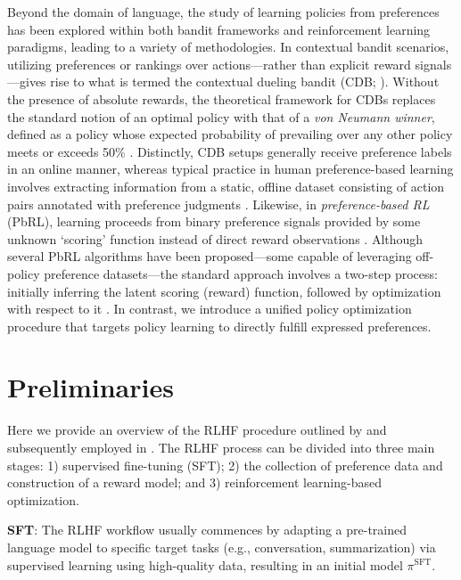 Beyond the domain of language, the study of learning policies from preferences has been explored within both bandit frameworks and reinforcement learning paradigms, leading to a variety of methodologies. In contextual bandit scenarios, utilizing preferences or rankings over actions—rather than explicit reward signals—gives rise to what is termed the contextual dueling bandit (CDB; \cite{yue2012karmed,dudik2015contextual}). Without the presence of absolute rewards, the theoretical framework for CDBs replaces the standard notion of an optimal policy with that of a \textit{von Neumann winner}, defined as a policy whose expected probability of prevailing over any other policy meets or exceeds 50\% \citep{dudik2015contextual}. Distinctly, CDB setups generally receive preference labels in an online manner, whereas typical practice in human preference-based learning involves extracting information from a static, offline dataset consisting of action pairs annotated with preference judgments \citep{yan2022human}. Likewise, in \textit{preference-based RL} (PbRL), learning proceeds from binary preference signals provided by some unknown ‘scoring’ function instead of direct reward observations \citep{BusaFekete2014,ruiz2023dueling}. Although several PbRL algorithms have been proposed—some capable of leveraging off-policy preference datasets—the standard approach involves a two-step process: initially inferring the latent scoring (reward) function, followed by optimization with respect to it \citep{jain2013learning,BusaFekete2014,christiano2017deep,sadigh2017active,kupcsik2018learning}. In contrast, we introduce a unified policy optimization procedure that targets policy learning to directly fulfill expressed preferences.

\section{Preliminaries}\label{section:prelims}

Here we provide an overview of the RLHF procedure outlined by \citeauthor{ziegler2020finetuning} and subsequently employed in \citep{stiennon2022learning, bai2022training, ouyang2022training}. The RLHF process can be divided into three main stages: 1) supervised fine-tuning (SFT); 2) the collection of preference data and construction of a reward model; and 3) reinforcement learning-based optimization.

\textbf{SFT}: The RLHF workflow usually commences by adapting a pre-trained language model to specific target tasks (e.g., conversation, summarization) via supervised learning using high-quality data, resulting in an initial model $\pi^\text{SFT}$.

